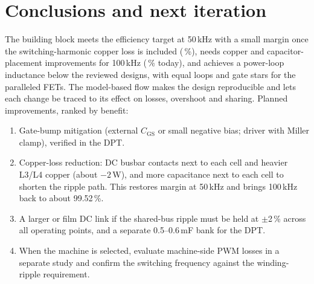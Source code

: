 \documentclass[10pt,a4paper]{article}
\begin{document}
\section{Conclusions and next iteration}
The building block meets the efficiency target at 50\,kHz with a small margin once the switching-harmonic copper loss is included (\Eta\,\%), needs copper and capacitor-placement improvements for 100\,kHz (\EtaHundred\,\% today), and achieves a power-loop inductance below the reviewed designs, with equal loops and gate stars for the paralleled FETs.
The model-based flow makes the design reproducible and lets each change be traced to its effect on losses, overshoot and sharing.
Planned improvements, ranked by benefit:
\begin{enumerate}\itemsep1pt
\item Gate-bump mitigation (external $C_\mathrm{GS}$ or small negative bias; driver with Miller clamp), verified in the DPT.
\item Copper-loss reduction: DC busbar contacts next to each cell and heavier L3/L4 copper (about $-2$\,W), and more capacitance next to each cell to shorten the ripple path. This restores margin at 50\,kHz and brings 100\,kHz back to about 99.52\,\%.
\item A larger or film DC link if the shared-bus ripple must be held at $\pm$2\,\% across all operating points, and a separate 0.5--0.6\,mF bank for the DPT.
\item When the machine is selected, evaluate machine-side PWM losses in a separate study and confirm the switching frequency against the winding-ripple requirement.
\end{enumerate}
\end{document}
